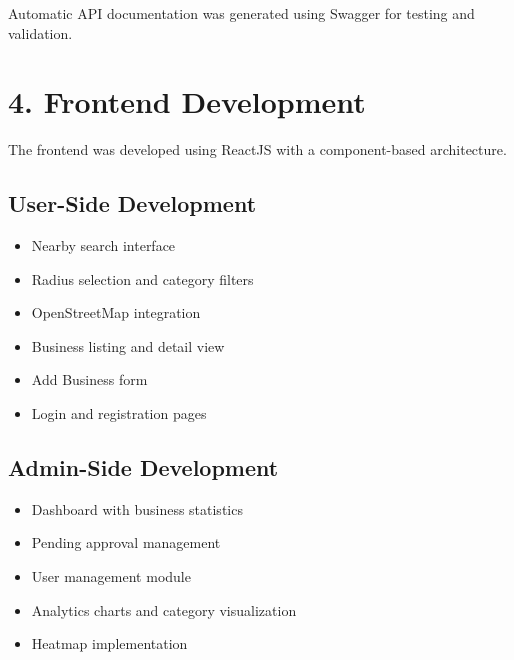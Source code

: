 \documentclass[12pt,a4paper]{report}
\begin{document}
Automatic API documentation was generated using Swagger for testing and validation.

\section{4. Frontend Development}

The frontend was developed using ReactJS with a component-based architecture.

\subsection*{User-Side Development}

\begin{itemize}

\item Nearby search interface

\item Radius selection and category filters

\item OpenStreetMap integration

\item Business listing and detail view

\item Add Business form

\item Login and registration pages

\end{itemize}

\subsection*{Admin-Side Development}

\begin{itemize}

\item Dashboard with business statistics

\item Pending approval management

\item User management module

\item Analytics charts and category visualization

\item Heatmap implementation

\end{itemize}
\end{document}
